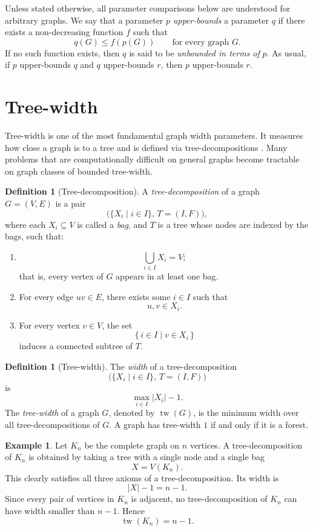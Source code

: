 \documentclass[10pt]{book}
\theoremstyle{definition}
\newtheorem{definition}[theorem]{Definition}
\newtheorem{example}[theorem]{Example}
\begin{document}
Unless stated otherwise, all parameter comparisons below are understood for arbitrary graphs.  
We say that a parameter \(p\) \emph{upper-bounds} a parameter \(q\) if there exists a non-decreasing function \(f\) such that
\[
q(G)\leq f(p(G))
\qquad
\text{for every graph } G.
\]
If no such function exists, then \(q\) is said to be \emph{unbounded in terms of} \(p\).
As usual, if \(p\) upper-bounds \(q\) and \(q\) upper-bounds \(r\), then \(p\) upper-bounds \(r\).

\section{Tree-width}
Tree-width is one of the most fundamental graph width parameters.  
It measures how close a graph is to a tree and is defined via tree-decompositions
\cite{47,213,214,215}.  
Many problems that are computationally difficult on general graphs become tractable on graph classes of bounded tree-width.

\begin{definition}[Tree-decomposition]
A \emph{tree-decomposition} of a graph \(G=(V,E)\) is a pair
\[
\bigl(\{X_i\mid i\in I\},\, T=(I,F)\bigr),
\]
where each \(X_i\subseteq V\) is called a \emph{bag}, and \(T\) is a tree whose nodes are indexed by the bags, such that:
\begin{enumerate}
    \item
    \[
    \bigcup_{i\in I} X_i = V;
    \]
    that is, every vertex of \(G\) appears in at least one bag.
    \item For every edge \(uv\in E\), there exists some \(i\in I\) such that
    \[
    u,v\in X_i.
    \]
    \item For every vertex \(v\in V\), the set
    \[
    \{\, i\in I \mid v\in X_i \,\}
    \]
    induces a connected subtree of \(T\).
\end{enumerate}
\end{definition}

\begin{definition}[Tree-width]
The \emph{width} of a tree-decomposition
\[
\bigl(\{X_i\mid i\in I\},\, T=(I,F)\bigr)
\]
is
\[
\max_{i\in I}|X_i|-1.
\]
The \emph{tree-width} of a graph \(G\), denoted by \(\operatorname{tw}(G)\), is the minimum width over all tree-decompositions of \(G\).
A graph has tree-width \(1\) if and only if it is a forest.
\end{definition}

\begin{example}
Let \(K_n\) be the complete graph on \(n\) vertices.
A tree-decomposition of \(K_n\) is obtained by taking a tree with a single node and a single bag
\[
X=V(K_n).
\]
This clearly satisfies all three axioms of a tree-decomposition.
Its width is
\[
|X|-1=n-1.
\]
Since every pair of vertices in \(K_n\) is adjacent, no tree-decomposition of \(K_n\) can have width smaller than \(n-1\). Hence
\[
\operatorname{tw}(K_n)=n-1.
\]
\end{example}
\end{document}
